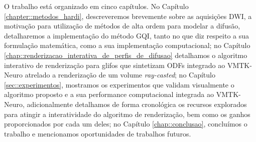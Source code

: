 \documentclass[
    12pt,                %
    oneside,            %
    a4paper,            %
    english,            %
    french,                %
    spanish,            %
    brazil                %
    ]{abntex2}
\begin{document}
O trabalho está organizado em cinco capítulos. No Capítulo \ref{chapter::metodos_hardi}, descreveremos brevemente sobre as aquisições DWI, a motivação para utilização de métodos de alta ordem para modelar a difusão, detalharemos a implementação do método GQI, tanto no que diz respeito a sua formulação matemática, como a sua implementação computacional; no Capítulo \ref{chap::renderizacao_interativa_de_perfis_de_difusao} detalhamos o algoritmo interativo de renderização para glifos que sintetizam ODFs integrado ao VMTK-Neuro atrelado a renderização de um volume \textit{ray-casted}; no Capítulo \ref{sec::experimentos}, mostramos os experimentos que validam visualmente o algoritmo proposto e a sua performance computacional integrada ao VMTK-Neuro, adicionalmente detalhamos de forma cronológica os recursos explorados para atingir a interatividade do algoritmo de renderização, bem como os ganhos proporcionados por cada um deles; no Capítulo \ref{chap::conclusao}, concluímos o trabalho e mencionamos oportunidades de trabalhos futuros.











%
\end{document}
